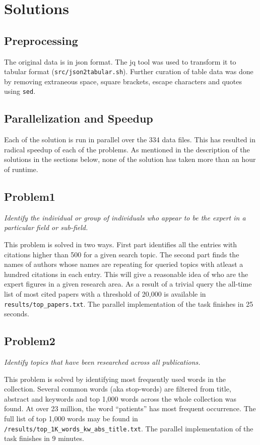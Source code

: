 \documentclass{article}
\begin{document}
\section*{Solutions}
\subsection*{Preprocessing}
The original data is in json format. The jq tool was used to transform it to
tabular format (\texttt{src/json2tabular.sh}). Further curation of table data
was done by removing extraneous space, square brackets, escape characters and
quotes using \texttt{sed}.

\subsection*{Parallelization and Speedup}
Each of the solution is run in parallel over the 334 data files. This has
resulted in radical speedup of each of the problems. As mentioned in the
description of the solutions in the sections below, none of the solution has
taken more than an hour of runtime.

\subsection*{Problem1}
\textit{Identify the individual or group of individuals who appear to be the expert in a particular field or sub-field.}

This problem is solved in two ways. First part identifies all the entries with
citations higher than 500 for a given search topic. The second part finds the
names of authors whose names are repeating for queried topics with atleast a
hundred citations in each entry. This will give a reasonable idea of who are
the expert figures in a given research area. As a result of a trivial query the
all-time list of most cited papers with a threshold of 20,000 is available in
\texttt{results/top\_papers.txt}. The parallel implementation of the task
finishes in 25 seconds.

\subsection*{Problem2}
\textit{Identify topics that have been researched across all publications.}

This problem is solved by identifying most frequently used words in the
collection. Several common words (aka stop-words) are filtered from title,
abstract and keywords and top 1,000 words across the whole collection was
found. At over 23 million, the word ``patients'' has most frequent occurrence.
The full list of top 1,000 words may be found in
\texttt{/results/top\_1K\_words\_kw\_abs\_title.txt}.  The parallel
implementation of the task finishes in 9 minutes.
\end{document}
